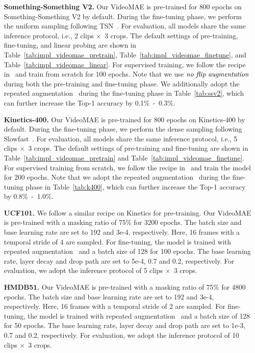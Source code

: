 \documentclass{article}
\def\x{$\times$}
\begin{document}
{\flushleft \bf Something-Something V2.} Our VideoMAE is pre-trained for 800 epochs on Something-Something V2 by default. During the fine-tuning phase, we perform the uniform sampling following TSN~\cite{tsn_journal}. For evaluation, all models share the same inference protocol, i.e., 2 clips \x~3 crops. The default settings of pre-training, fine-tuning, and linear probing are shown in Table~\ref{tab:impl_videomae_pretrain}, Table~\ref{tab:impl_videomae_finetune}, and Table~\ref{tab:impl_videomae_linear}. For supervised training, we follow the recipe in~\cite{mvit} and train from scratch for 100 epochs.
Note that we use $\emph{no flip augmentation}$ during both the pre-training and fine-tuning phase. We additionally adopt the repeated augmentation~\cite{repeated_aug} during the fine-tuning phase in Table~\ref{tab:ssv2}, which can further increase the Top-1 accuracy by 0.1\%~-~0.3\%.

{\flushleft \bf Kinetics-400.} Our VideoMAE is pre-trained for 800 epochs on Kinetics-400 by default. During the fine-tuning phase, we perform the dense sampling following Slowfast~\cite{slowfast}. For evaluation, all models share the same inference protocol, i.e., 5 clips \x~3 crops. The default settings of pre-training and fine-tuning are shown in Table~\ref{tab:impl_videomae_pretrain} and Table~\ref{tab:impl_videomae_finetune}. For supervised training from scratch, we follow the recipe in~\cite{mvit} and train the model for 200 epochs. Note that we adopt the repeated augmentation~\cite{repeated_aug} during the fine-tuning phase in Table~\ref{tab:k400}, which can further increase the Top-1 accuracy by 0.8\%~-~1.0\%.

{\flushleft \bf UCF101.} We follow a similar recipe on Kinetics for pre-training. Our VideoMAE is pre-trained with a masking ratio of 75\% for 3200 epochs. The  batch size and base learning rate are set to 192 and 3e-4, respectively. Here, 16 frames with a temporal stride of 4 are sampled. For fine-tuning, the model is trained with repeated augmentation~\cite{repeated_aug} and a batch size of 128 for 100 epochs. The base learning rate, layer decay and drop path are set to 5e-4, 0.7 and 0.2, respectively. For evaluation, we adopt the inference protocol of 5 clips \x~3 crops.

{\flushleft \bf HMDB51.} Our VideoMAE is pre-trained with a masking ratio of 75\% for 4800 epochs. The batch size and base learning rate are set to 192 and 3e-4, respectively. Here, 16 frames with a temporal stride of 2 are sampled. For fine-tuning, the model is trained with repeated augmentation~\cite{repeated_aug} and a batch size of 128 for 50 epochs. The base learning rate, layer decay and drop path are set to 1e-3, 0.7 and 0.2, respectively. For evaluation, we adopt the inference protocol of 10 clips \x~3 crops.
\end{document}
